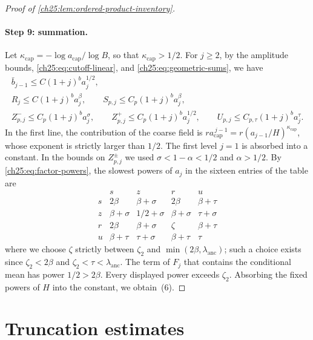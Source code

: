 \begin{proof}[Proof of \cref{ch25:lem:ordered-product-inventory}]
\paragraph{Step 9: summation.}
Let $\kappa_{\mathrm{cap}}=-\log a_{\mathrm{cap}}/\log B$, so that $\kappa_{\mathrm{cap}}>1/2$. For $j\ge2$, by the amplitude bounds, \eqref{ch25:eq:cutoff-linear}, and \eqref{ch25:eq:geometric-sums}, we have
\begin{equation}\label{ch25:eq:factor-powers}
 \begin{gathered}
 \bar b_{j-1}\le C(1+j)^ba_j^{1/2},\\
 R_j\le C(1+j)^ba_j^\beta,\qquad S_{p,j}\le C_p(1+j)^ba_j^\beta,\\
 Z^-_{p,j}\le C_p(1+j)^ba_j^\sigma,\qquad Z^+_{p,j}\le C_p(1+j)^ba_j^{1/2},\qquad
 U_{p,j}\le C_{p,\tau}(1+j)^ba_j^\tau.
 \end{gathered}
\end{equation}
In the first line, the contribution of the coarse field is $ra_{\mathrm{cap}}^{\,j-1}=r(a_{j-1}/H)^{\kappa_{\mathrm{cap}}}$, whose exponent is strictly larger than $1/2$. The first level $j=1$ is absorbed into a constant. In the bounds on $Z^\pm_{p,j}$ we used $\sigma<1-\alpha<1/2$ and $\alpha>1/2$. By \eqref{ch25:eq:factor-powers}, the slowest powers of $a_j$ in the sixteen entries of the table are
\[
\begin{array}{c|cccc}
 &s&z&r&u\\\hline
 s&2\beta&\beta+\sigma&2\beta&\beta+\tau\\
 z&\beta+\sigma&1/2+\sigma&\beta+\sigma&\tau+\sigma\\
 r&2\beta&\beta+\sigma&\zeta&\beta+\tau\\
 u&\beta+\tau&\tau+\sigma&\beta+\tau&\tau
\end{array}
\]
where we choose $\zeta$ strictly between $\zeta_2$ and $\min(2\beta,\lambda_{\mathrm{anc}})$; such a choice exists since $\zeta_2<2\beta$ and $\zeta_2<\tau<\lambda_{\mathrm{anc}}$. The term of $F_j$ that contains the conditional mean has power $1/2>2\beta$. Every displayed power exceeds $\zeta_2$. Absorbing the fixed powers of $H$ into the constant, we obtain~(6).
\end{proof}

\section{Truncation estimates}\label{ch25:sec:truncation}

